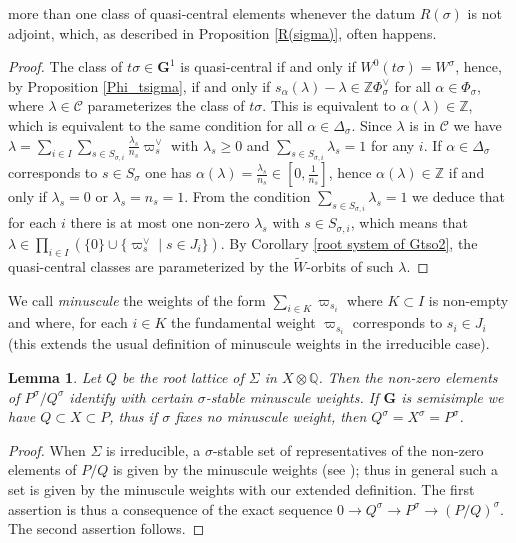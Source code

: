 \documentclass{amsart}
\newtheorem{lemma}[equation]{Lemma}
\numberwithin{equation}{section}
\theoremstyle{definition}
\theoremstyle{remark}
\newcommand\bG{{\mathbf G}}
\newcommand\BQ{{\mathbb Q}}
\newcommand\BZ{{\mathbb Z}}
\newcommand\CC{{\mathcal C}}
\newcommand\Gun{{\bG^1}}
\newcommand\tW{{\widetilde W}}
\begin{document}
more than one class of quasi-central elements whenever the datum 
$R(\sigma)$ is not adjoint,
which,  as described in Proposition \ref{R(sigma)}, often happens.
\begin{proof}
The   class   of   $t\sigma\in\Gun$   is   quasi-central  if  and  only  if
$W^0(t\sigma)=W^\sigma$,  hence,  by  Proposition  \ref{Phi_tsigma}, if and
only    if   $s_\alpha(\lambda)-\lambda\in\BZ\Phi_\sigma^\vee$    for   all
$\alpha\in\Phi_\sigma$,  where  $\lambda\in\CC$  parameterizes  the class of
$t\sigma$.   This   is   equivalent   to  $\alpha(\lambda)\in\BZ$, which is
equivalent to the same condition for  all $\alpha\in\Delta_\sigma$.
Since  $\lambda$ is in $\CC$ we
have $\lambda=\sum_{i\in I}\sum_{s\in S_{\sigma,i}}
\frac{\lambda_s}{n_s}\varpi_s^\vee$  with $\lambda_s\geq 0$ and $\sum_{s\in
S_{\sigma,i}}\lambda_s=1$  for  any  $i$.  If  $\alpha\in\Delta_\sigma$
corresponds to $s\in S_\sigma$ one has
$\alpha(\lambda)=\frac{\lambda_s}{n_s}\in[0,\frac1{n_s}]$,     hence
$\alpha(\lambda)\in\BZ$   if  and  only  if $\lambda_s=0$ or
$\lambda_s=n_s=1$. From the condition $\sum_{s\in S_{\sigma,i}}\lambda_s=1$
we  deduce that for each $i$ there is at most one non-zero $\lambda_s$ with
$s\in    S_{\sigma,i}$,   which   means    that   $\lambda\in   \prod_{i\in
I}(\{0\}\cup\{\varpi_s^\vee\mid s\in J_i\})$.
By Corollary \ref{root system of Gtso2}, the quasi-central classes
are parameterized by the $\tW$-orbits of such $\lambda$.
\end{proof}
We call {\em minuscule}  the weights of the form
$\sum_{i\in K}\varpi_{s_i}$  where $K\subset I$ is non-empty
and where, for each $i\in K$ the fundamental weight 
$\varpi_{s_i}$ corresponds to $s_i\in J_i$ (this
extends the usual definition of minuscule weights in the irreducible case).
\begin{lemma}\label{minuscule}
Let $Q$ be the root lattice of $\Sigma$ in $X\otimes\BQ$.
Then the non-zero elements of $P^\sigma/Q^\sigma$ identify with certain
$\sigma$-stable minuscule weights.
If $\bG$ is semisimple we have $Q\subset X\subset P$, thus
if $\sigma$ fixes no minuscule weight, then $Q^\sigma=X^\sigma=P^\sigma$.
\end{lemma}
\begin{proof}
When  $\Sigma$ is irreducible,  a $\sigma$-stable set  of representatives of 
the
non-zero elements of $P/Q$ is given by the minuscule weights (see \cite[VI,
\S2,  exercice 5]{Bou}); thus  in general such  a set is  given by the 
minuscule weights with our extended definition.
The  first
assertion  is  thus  a  consequence  of  the  exact  sequence $0\rightarrow
Q^\sigma\rightarrow  P^\sigma\rightarrow(P/Q)^\sigma$. The second assertion
follows.
\end{proof}
\end{document}
